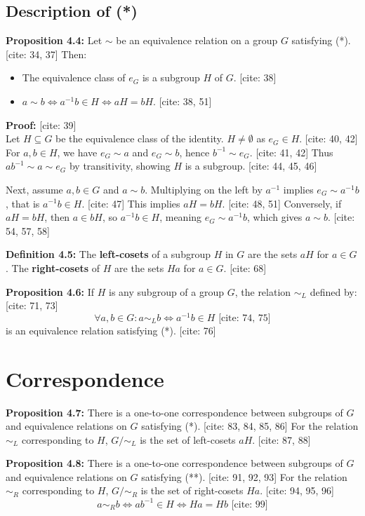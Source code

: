 \subsection{Description of (*)}

\textbf{Proposition 4.4:} Let $\sim$ be an equivalence relation on a group $G$ satisfying (*). [cite: 34, 37] Then:
\begin{itemize}
    \item The equivalence class of $e_G$ is a subgroup $H$ of $G$. [cite: 38]
    \item $a \sim b \iff a^{-1}b \in H \iff aH = bH$. [cite: 38, 51]
\end{itemize}

\textbf{Proof:} [cite: 39] \\
Let $H \subseteq G$ be the equivalence class of the identity. $H \neq \emptyset$ as $e_G \in H$. [cite: 40, 42] For $a, b \in H$, we have $e_G \sim a$ and $e_G \sim b$, hence $b^{-1} \sim e_G$. [cite: 41, 42] Thus $ab^{-1} \sim a \sim e_G$ by transitivity, showing $H$ is a subgroup. [cite: 44, 45, 46]

Next, assume $a, b \in G$ and $a \sim b$. Multiplying on the left by $a^{-1}$ implies $e_G \sim a^{-1}b$, that is $a^{-1}b \in H$. [cite: 47] This implies $aH = bH$. [cite: 48, 51] Conversely, if $aH = bH$, then $a \in bH$, so $a^{-1}b \in H$, meaning $e_G \sim a^{-1}b$, which gives $a \sim b$. [cite: 54, 57, 58]

\textbf{Definition 4.5:} The \textbf{left-cosets} of a subgroup $H$ in $G$ are the sets $aH$ for $a \in G$. The \textbf{right-cosets} of $H$ are the sets $Ha$ for $a \in G$. [cite: 68]

\textbf{Proposition 4.6:} If $H$ is any subgroup of a group $G$, the relation $\sim_L$ defined by: [cite: 71, 73]
\[ \forall a, b \in G: a \sim_L b \iff a^{-1}b \in H \text{ [cite: 74, 75]} \]
is an equivalence relation satisfying (*). [cite: 76]

\section{Correspondence}

\textbf{Proposition 4.7:} There is a one-to-one correspondence between subgroups of $G$ and equivalence relations on $G$ satisfying (*). [cite: 83, 84, 85, 86] For the relation $\sim_L$ corresponding to $H$, $G/\sim_L$ is the set of left-cosets $aH$. [cite: 87, 88]

\textbf{Proposition 4.8:} There is a one-to-one correspondence between subgroups of $G$ and equivalence relations on $G$ satisfying (**). [cite: 91, 92, 93] For the relation $\sim_R$ corresponding to $H$, $G/\sim_R$ is the set of right-cosets $Ha$. [cite: 94, 95, 96]
\[ a \sim_R b \iff ab^{-1} \in H \iff Ha = Hb \text{ [cite: 99]} \]

